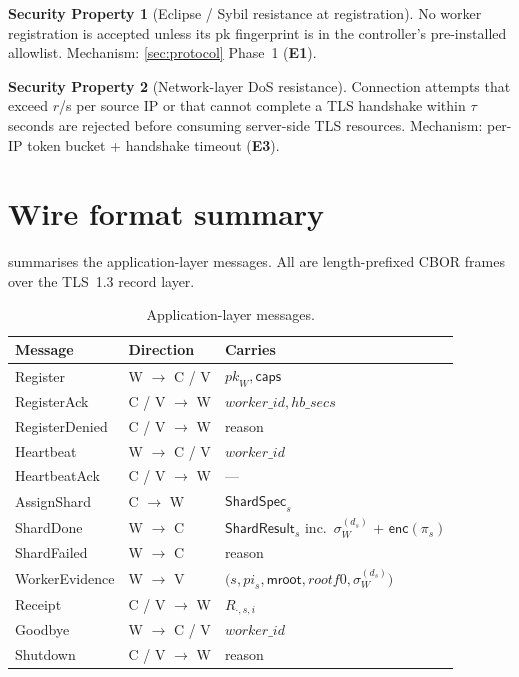 \documentclass[11pt,a4paper]{article}
\theoremstyle{definition}
\newtheorem{property}{Security Property}
\theoremstyle{plain}
\newcommand{\msg}[1]{\textsf{#1}}
\newcommand{\sig}[2]{\ensuremath{\sigma_{#1}^{(#2)}}}
\begin{document}
\begin{property}[Eclipse / Sybil resistance at registration]
\label{prop:e1}
No worker registration is accepted unless its pk fingerprint is in
the controller's pre-installed allowlist.  Mechanism: \cref{sec:protocol}
Phase~1 (\textbf{E1}).
\end{property}

\begin{property}[Network-layer DoS resistance]
\label{prop:e3}
Connection attempts that exceed $r$/s per source IP or that cannot
complete a TLS handshake within $\tau$ seconds are rejected before
consuming server-side TLS resources.  Mechanism: per-IP token bucket
+ handshake timeout (\textbf{E3}).
\end{property}

\section{Wire format summary}

 summarises the application-layer messages.  All are
length-prefixed CBOR frames over the TLS~1.3 record layer.

\begin{table}[h]
\centering\small
\begin{tabular}{lll}
  \toprule
  Message & Direction & Carries \\
  \midrule
  \msg{Register}        & W $\to$ C / V & $\mathit{pk}_W, \mathsf{caps}$ \\
  \msg{RegisterAck}     & C / V $\to$ W & $\mathit{worker\_id}, \mathit{hb\_secs}$ \\
  \msg{RegisterDenied}  & C / V $\to$ W & reason \\
  \msg{Heartbeat}       & W $\to$ C / V & $\mathit{worker\_id}$ \\
  \msg{HeartbeatAck}    & C / V $\to$ W & --- \\
  \msg{AssignShard}     & C $\to$ W     & $\msg{ShardSpec}_s$ \\
  \msg{ShardDone}       & W $\to$ C     & $\msg{ShardResult}_s$ inc.\ $\sig{W}{d_s}$ + $\mathsf{enc}(\pi_s)$ \\
  \msg{ShardFailed}     & W $\to$ C     & reason \\
  \msg{WorkerEvidence}  & W $\to$ V     & $\bigl(s, \mathit{pi}_s, \mathsf{mroot}, \mathit{rootf0}, \sig{W}{d_s}\bigr)$ \\
  \msg{Receipt}         & C / V $\to$ W & $R_{\cdot,s,i}$ \\
  \msg{Goodbye}         & W $\to$ C / V & $\mathit{worker\_id}$ \\
  \msg{Shutdown}        & C / V $\to$ W & reason \\
  \bottomrule
\end{tabular}
\caption{Application-layer messages.}
\label{tab:msgs}
\end{table}
\end{document}
